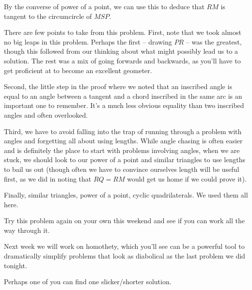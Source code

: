 
By the converse of power of a point, we can use this to deduce that $RM$ is tangent to the circumcircle of $MSP$.

There are few points to take from this problem. First, note that we took almost no big leaps in this problem. Perhaps the first -- drawing $PR$ -- was the greatest, though this followed from our thinking about what might possibly lead us to a solution. The rest was a mix of going forwards and backwards, as you'll have to get proficient at to become an excellent geometer.

Second, the little step in the proof where we noted that an inscribed angle is equal to an angle between a tangent and a chord inscribed in the same arc is an important one to remember. It's a much less obvious equality than two inscribed angles and often overlooked.

Third, we have to avoid falling into the trap of running through a problem with angles and forgetting all about using lengths. While angle chasing is often easier and is definitely the place to start with problems involving angles, when we are stuck, we should look to our power of a point and similar triangles to use lengths to bail us out (though often we have to convince ourselves length will be useful first, as we did in noting that $RQ = RM$ would get us home if we could prove it).

Finally, similar triangles, power of a point, cyclic quadrilaterals. We used them all here.

Try this problem again on your own this weekend and see if you can work all the way through it.

Next week we will work on homothety, which you'll see can be a powerful tool to dramatically simplify problems that look as diabolical as the last problem we did tonight.


Perhaps one of you can find one slicker/shorter solution. 

